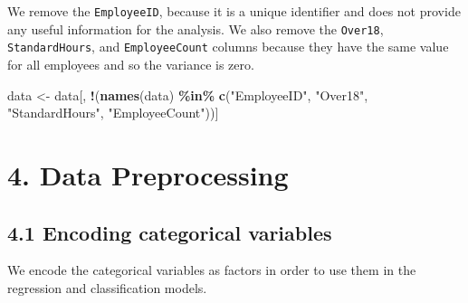 \documentclass[
]{article}
\newenvironment{Shaded}{\begin{snugshade}}{\end{snugshade}}
\newcommand{\FunctionTok}[1]{\textcolor[rgb]{0.13,0.29,0.53}{\textbf{#1}}}
\newcommand{\NormalTok}[1]{#1}
\newcommand{\OtherTok}[1]{\textcolor[rgb]{0.56,0.35,0.01}{#1}}
\newcommand{\SpecialCharTok}[1]{\textcolor[rgb]{0.81,0.36,0.00}{\textbf{#1}}}
\newcommand{\StringTok}[1]{\textcolor[rgb]{0.31,0.60,0.02}{#1}}
\begin{document}
We remove the \texttt{EmployeeID}, because it is a unique identifier and
does not provide any useful information for the analysis. We also remove
the \texttt{Over18}, \texttt{StandardHours}, and \texttt{EmployeeCount}
columns because they have the same value for all employees and so the
variance is zero.

\begin{Shaded}
\begin{Highlighting}[]
\NormalTok{data }\OtherTok{\textless{}{-}}\NormalTok{ data[, }\SpecialCharTok{!}\NormalTok{(}\FunctionTok{names}\NormalTok{(data) }\SpecialCharTok{\%in\%} \FunctionTok{c}\NormalTok{(}\StringTok{"EmployeeID"}\NormalTok{, }\StringTok{"Over18"}\NormalTok{, }\StringTok{"StandardHours"}\NormalTok{, }\StringTok{"EmployeeCount"}\NormalTok{))]}
\end{Highlighting}
\end{Shaded}

\hypertarget{data-preprocessing}{%
\section{4. Data Preprocessing}\label{data-preprocessing}}

\hypertarget{encoding-categorical-variables}{%
\subsection{4.1 Encoding categorical
variables}\label{encoding-categorical-variables}}

We encode the categorical variables as factors in order to use them in
the regression and classification models.
\end{document}
